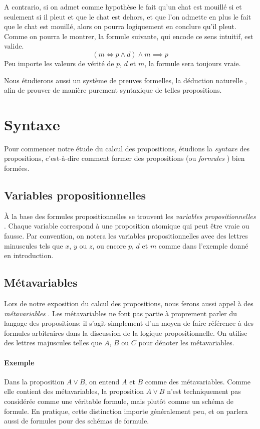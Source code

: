A contrario, si on admet comme hypothèse le fait qu'un chat est mouillé si et seulement si il pleut et que le chat est dehors, et que l'on admette en plus le fait que le chat est mouillé, alors on pourra logiquement en conclure qu'il pleut.
Comme on pourra le montrer, la formule suivante, qui encode ce sens intuitif, est valide.
\[
(m \iff p \wedge d) \wedge m \implies p
\]
Peu importe les valeurs de vérité de $p$, $d$ et $m$, la formule sera toujours vraie.

Nous étudierons aussi un système de preuves formelles, la \og déduction naturelle \fg{}, afin de prouver de manière purement syntaxique de telles propositions.

\section{Syntaxe}

Pour commencer notre étude du calcul des propositions, étudions la \textit{syntaxe} des propositions, c'est-à-dire comment former des propositions (ou \og \textit{formules} \fg{}) bien formées. 

\subsection{Variables propositionnelles}

À la base des formules propositionnelles se trouvent les \og{} \textit{variables propositionnelles} \fg{}.
Chaque variable correspond à une proposition atomique qui peut être vraie ou fausse.
Par convention, on notera les variables propositionnelles avec des lettres minuscules tels que $x$, $y$ ou $z$, ou encore $p$, $d$ et $m$ comme dans l'exemple donné en introduction.

\subsection{Métavariables}

Lors de notre exposition du calcul des propositions, nous ferons aussi appel à des \og \textit{métavariables} \fg{}.
Les métavariables ne font pas partie à proprement parler du langage des propositions: il s'agit simplement d'un moyen de faire référence à des formules arbitraires dans la discussion de la logique propositionnelle.
On utilise des lettres majuscules telles que $A$, $B$ ou $C$ pour dénoter les métavariables.

\paragraph{Exemple} Dans la proposition $A \vee B$, on entend $A$ et $B$ comme des métavariables.
Comme elle contient des métavariables, la proposition $A \vee B$ n'est techniquement pas considérée comme une véritable formule, mais plutôt comme un schéma de formule.
En pratique, cette distinction importe généralement peu, et on parlera aussi de formules pour des schémas de formule.


